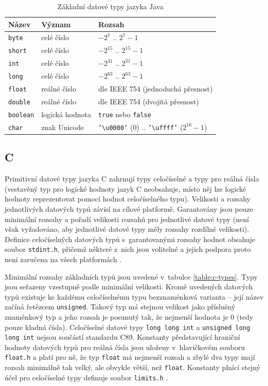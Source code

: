 \documentclass[czech,BP]{thesiskiv}
\begin{document}
\begin{table}\centering
\caption{Základní datové typy jazyka Java}
\begin{tabular}{| l | l | l |}
\hline
\textbf{Název} & \textbf{Význam} & \textbf{Rozsah} \\ \hline
\texttt{byte} & celé číslo & $-2^7$ .. $2^7-1$ \\ \hline
\texttt{short} & celé číslo & $-2^{15}$ .. $2^{15}-1$ \\ \hline
\texttt{int} & celé číslo & $-2^{31}$ .. $2^{31}-1$ \\ \hline
\texttt{long} & celé číslo & $-2^{63}$ .. $2^{63}-1$ \\ \hline
\texttt{float} & reálné číslo & dle IEEE 754 (jednoduchá přesnost) \\ \hline
\texttt{double} & reálné číslo & dle IEEE 754 (dvojitá přesnost) \\ \hline
\texttt{boolean} & logická hodnota & \texttt{true} nebo \texttt{false} \\ \hline
\texttt{char} & znak Unicode & \texttt{'\textbackslash u0000'} ($0$) .. \texttt{'\textbackslash uffff'} ($2^{16} - 1$) \\ \hline
\end{tabular}
\label{table:java-types}
\end{table}

\subsection{C}
Primitivní datové typy jazyka C zahrnují typy celočíselné a typy pro reálná čísla (vestavěný typ pro logické hodnoty jazyk C neobsahuje, místo něj lze logické hodnoty reprezentovat pomocí hodnot celočíselného typu). Velikosti a rozsahy jednotlivých datových typů závisí na cílové platformě. Garantovány jsou pouze minimální rozsahy a pořadí velikosti rozsahů pro jednotlivé datové typy (není však vyžadováno, aby jednotlivé datové typy měly rozsahy rozdílné velikosti). Definice celočíselných datových typů s~garantovanými rozsahy hodnot obsahuje soubor \texttt{stdint.h}, přičemž některé z~nich jsou volitelné a jejich podpora proto není zaručena na všech platformách \cite{c-guide, cpp-guide-stdint}.\par

Minimální rozsahy základních typů jsou uvedené v~tabulce \ref{table:c-types}. Typy jsou seřazeny vzestupně podle minimální velikosti. Kromě uvedených datových typů existuje ke každému celočíselnému typu bezznaménková varianta -- její název začíná řetězcem \texttt{unsigned}. Takový typ má stejnou velikost jako příslušný znaménkový typ a jeho rozsah je posunutý tak, že nejmenší hodnota je 0 (tedy pouze kladná čísla). Celočíselné datové typy \texttt{long long int} a \texttt{unsigned long long int} nejsou součástí standardu C89. Konstanty představující hraniční hodnoty datových typů pro reálná čísla jsou uloženy v~hlavičkovém souboru \texttt{float.h} a platí pro ně, že typ \texttt{float} má nejmenší rozsah a zbylé dva typy mají rozsah minimálně tak velký, ale obvykle větší, než \texttt{float}. Konstanty plnící stejný účel pro celočíselné typy definuje soubor \texttt{limits.h} \cite{c-guide}.
\end{document}
